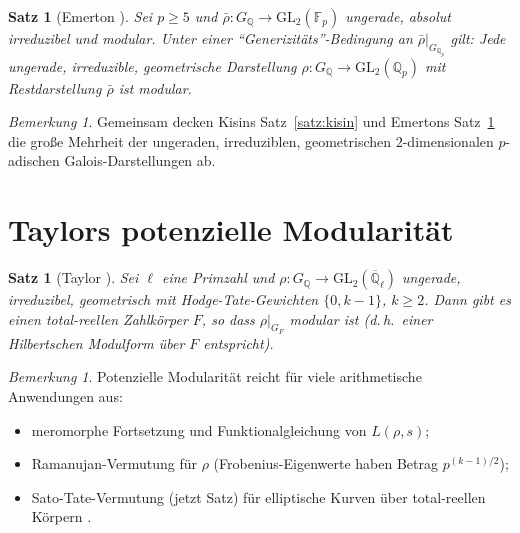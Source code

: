 \documentclass[12pt,a4paper]{amsart}
\newtheorem{satz}[theorem]{Satz}
\theoremstyle{definition}
\theoremstyle{remark}
\newtheorem{bemerkung}[theorem]{Bemerkung}
\newcommand{\GL}{\mathrm{GL}}
\newcommand{\Qp}{\mathbb{Q}_p}
\newcommand{\GQ}{G_{\mathbb{Q}}}
\newcommand{\Q}{\mathbb{Q}}
\newcommand{\F}{\mathbb{F}}
\begin{document}
\begin{satz}[Emerton \cite{Emerton2010}]\label{satz:emerton}
  Sei $p \geq 5$ und $\bar{\rho}\colon \GQ \to \GL_2(\F_p)$ ungerade, absolut irreduzibel
  und modular. Unter einer ``Generizitäts''-Bedingung an $\bar{\rho}|_{G_{\Qp}}$ gilt:
  Jede ungerade, irreduzible, geometrische Darstellung $\rho\colon \GQ \to \GL_2(\Qp)$
  mit Restdarstellung $\bar{\rho}$ ist modular.
\end{satz}

\begin{bemerkung}
  Gemeinsam decken Kisins Satz~\ref{satz:kisin} und Emertons Satz~\ref{satz:emerton}
  die große Mehrheit der ungeraden, irreduziblen, geometrischen $2$-dimensionalen
  $p$-adischen Galois-Darstellungen ab.
\end{bemerkung}

\section{Taylors potenzielle Modularität}\label{sec:taylor}

\begin{satz}[Taylor \cite{Taylor2002}]\label{satz:taylor}
  Sei $\ell$ eine Primzahl und $\rho\colon \GQ \to \GL_2(\overline{\Q}_\ell)$ ungerade,
  irreduzibel, geometrisch mit Hodge-Tate-Gewichten $\{0, k-1\}$, $k \geq 2$.
  Dann gibt es einen total-reellen Zahlkörper $F$, so dass $\rho|_{G_F}$ modular ist
  (d.\,h.\ einer Hilbertschen Modulform über $F$ entspricht).
\end{satz}

\begin{bemerkung}
  Potenzielle Modularität reicht für viele arithmetische Anwendungen aus:
  \begin{itemize}
    \item meromorphe Fortsetzung und Funktionalgleichung von $L(\rho, s)$;
    \item Ramanujan-Vermutung für $\rho$ (Frobenius-Eigenwerte haben Betrag $p^{(k-1)/2}$);
    \item Sato-Tate-Vermutung (jetzt Satz) für elliptische Kurven über total-reellen
      Körpern \cite{BGHT2011}.
  \end{itemize}
\end{bemerkung}

\end{document}
